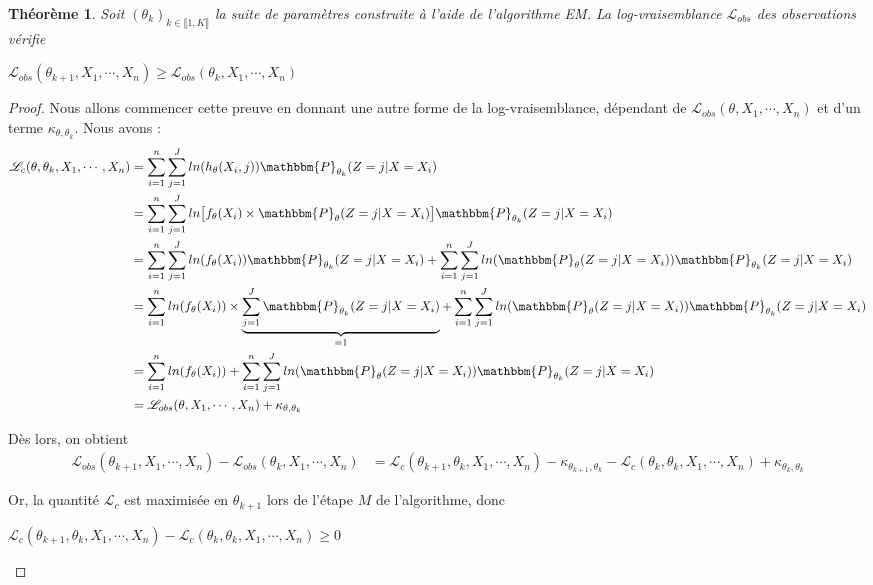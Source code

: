 \documentclass[frenchb]{report}
\newcommand{\1}{\mathbbm{1}}
\newcommand{\prob}{\mathbbm{P}}
\newcommand{\lv}{\mathcal{L}}
\newtheorem{thm}{Théorème}
\theoremstyle{definition}\newtheorem{defn}{Définition}
\theoremstyle{definition}\newtheorem{exm}{Exemple}
\theoremstyle{definition}\newtheorem{nota}{Notation}
\theoremstyle{definition}\newtheorem{rem}{Remarque}
\begin{document}
\begin{thm}
Soit $(\theta_k)_{k\in \llbracket1, K\rrbracket}$ la suite de paramètres construite à l'aide de l'algorithme EM. La log-vraisemblance $\lv_{obs}$ des observations vérifie 
\begin{center} $\lv_{obs}(\theta_{k+1}, X_1, \cdots, X_n) \geq \lv_{obs}(\theta_k, X_1, \cdots, X_n)$ \end{center}
\end{thm}

\begin{proof}

Nous allons commencer cette preuve en donnant une autre forme de la log-vraisemblance, dépendant de $\lv_ {obs}(\theta, X_1, \cdots, X_n)$ et d'un terme $\kappa_{\theta,\theta_k}$. Nous avons :
\begin{align*}
\lv_c(\theta, \theta_k, X_1, \cdots, X_n) &=  \displaystyle\sum_{i=1}^n\sum_{j=1}^J ln(h_\theta(X_i ,j))  \prob_{\theta_k}(Z = j|X = X_i)\\
&=  \displaystyle\sum_{i=1}^n\sum_{j=1}^J ln\big[f_\theta(X_i)\times \prob_\theta(Z = j|X=X_i)\big]\prob_{\theta_k}(Z = j|X = X_i)\\
&=  \displaystyle\sum_{i=1}^n\sum_{j=1}^J ln(f_\theta(X_i))\prob_{\theta_k}(Z = j|X = X_i) + \sum_{i=1}^n\sum_{j=1}^J ln(\prob_\theta(Z = j|X=X_i))\prob_{\theta_k}(Z = j|X = X_i)\\
&= \displaystyle\sum_{i=1}^n ln(f_\theta(X_i))\times\underbrace{\sum_{j=1}^J \prob_{\theta_k}(Z = j|X = X_i)}_{=1} + \sum_{i=1}^n\sum_{j=1}^J ln(\prob_\theta(Z = j|X = X_i))\prob_{\theta_k}(Z = j|X = X_i)\\
&= \displaystyle\sum_{i=1}^n ln(f_\theta(X_i)) + \sum_{i=1}^n\sum_{j=1}^J ln(\prob_\theta(Z = j|X=X_i))\prob_{\theta_k}(Z = j|X = X_i) \\
&= \lv_{obs}(\theta, X_1, \cdots, X_n) + \kappa_{\theta,\theta_k}
\end{align*}

Dès lors, on obtient
\begin{align*}
\lv_{obs}(\theta_{k+1}, X_1, \cdots, X_n) - \lv_{obs}(\theta_k, X_1, \cdots, X_n) &= \lv_c(\theta_{k+1}, \theta_k, X_1, \cdots, X_n) - \kappa_{\theta_{k+1}, \theta_k} -  \lv_c(\theta_k, \theta_k, X_1, \cdots, X_n) + \kappa_{\theta_{k}, \theta_k}
\end{align*}

Or, la quantité $\lv_c$ est maximisée en $\theta_{k+1}$ lors de l'étape $M$ de l'algorithme, donc
\begin{center} $ \lv_c(\theta_{k+1}, \theta_k, X_1, \cdots, X_n) - \lv_c(\theta_k, \theta_k, X_1, \cdots, X_n) \geq 0$ \end{center}


\end{proof}
\end{document}
